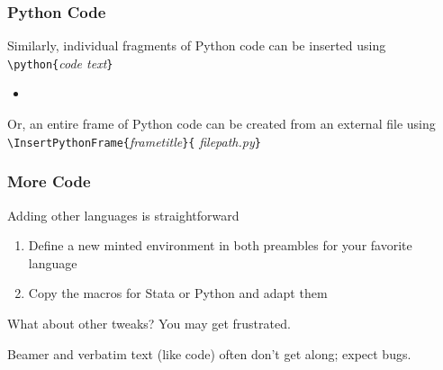 \documentclass[aspectratio=169,handout]{beamer}
\begin{document}
	
\begin{frame}
	\frametitle{Python Code}
	\begin{witem}
		\item Similarly, individual fragments of Python code can be
			inserted using \texttt{\textbackslash{}python\{}\textit{code text}\texttt{\}}
			\begin{itemize}
				\item {}
			\end{itemize}
		\item Or, an entire frame of Python code can be created from an external file 
			using
			\texttt{\textbackslash{}InsertPythonFrame\{}\textit{frametitle}\texttt{\}\{}
\textit{filepath.py}\texttt{\}}
	\end{witem}
\end{frame}
	
	

	
	
	
\begin{frame}
	\frametitle{More Code}
	\begin{witem}
		\item Adding other languages is straightforward
			\begin{enumerate}
				\item Define a new minted environment
					in both preambles for your favorite language
				\item Copy the macros for Stata or Python and adapt them
			\end{enumerate}
		\item What about other tweaks? You may get frustrated.
		\item Beamer and verbatim text (like code) often don't get along; expect bugs.
	\end{witem}
\end{frame}
	
	


	
\end{document}
